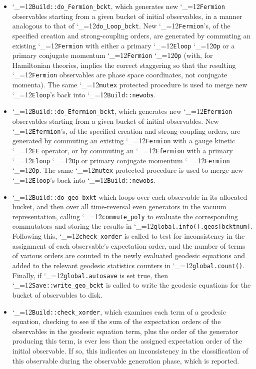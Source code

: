 \documentclass [12pt]{article}
\makeatletter
\renewcommand{\tt}{\begingroup\catcode`_=12\def\_{\string_}\tt@}
\newcommand{\tt@}[1]{\texttt{#1}\endgroup}
\makeatother
\begin{document}
\begin{itemize}
\item
    \tt{Build::do_Fermion_bckt}, which generates
    new \tt{Fermion} observables starting from a given
    bucket of initial observables, in a 
    manner analogous to that of \tt{do_Loop_bckt}.
    New \tt{Fermion}'s, of the specified creation
    and strong-coupling orders, are generated by
    commuting an existing
    \tt{Fermion} with either a primary \tt{Eloop} \tt{Op} or
    a primary conjugate momentum \tt{Fermion} \tt{Op} (with, for Hamiltonian
    theories, implies the correct staggering so that the resulting
    \tt{Fermion} observables are phase space coordinates,
    not conjugate momenta).
    The same \tt{mutex} protected procedure is used to
    merge new \tt{Eloop}'s back into \tt{Build::newobs}.

\item
    \tt{Build::do_Efermion_bckt}, which generates
    new \tt{Efermion} observables starting from a given
    bucket of initial observables.
    New \tt{Efermion}'s, of the specified creation
    and strong-coupling orders, are generated by
    commuting an existing
    \tt{Fermion} with a gauge kinetic \tt{EE} operator,
    or by commuting an
    \tt{Efermion} with a primary \tt{Eloop} \tt{Op} or
    primary conjugate momentum \tt{Fermion} \tt{Op}.
    The same \tt{mutex} protected procedure is used to
    merge new \tt{Eloop}'s back into \tt{Build::newobs}.

\item
    \tt{Build::do_geo_bxkt} which loops over each observable
    in its allocated bucket, and then over all
    time-reversal even generators in the vacuum representation,
    calling \tt{commute_poly} to evaluate the corresponding
    commutators and storing the results in
    \tt{global.info().geos[bcktnum]}.
    Following this,
    \tt{check_xorder} is called to test for
    inconsistency in the assignment of each observable's
    expectation order,
    and the number of terms of various orders are counted
    in the newly evaluated geodesic equations and added to
    the relevant geodesic statistics counters in \tt{global.count()}.
    Finally, if \tt{global.autosave} is set true, then
    \tt{Save::write_geo_bckt} is called to write the geodesic
    equations for the bucket of observables to disk.

\item
    \tt{Build::check_xorder}, which examines each term of a
    geodesic equation,
    checking to see if the sum of the expectation orders
    of the observables in the geodesic equation term,
    plus the order of the generator producing this term,
    is ever less than the assigned expectation order of the initial
    observable.
    If so, this indicates an inconsistency in the classification
    of this observable during the observable generation phase,
    which is reported.


\end{itemize}
\end{document}
